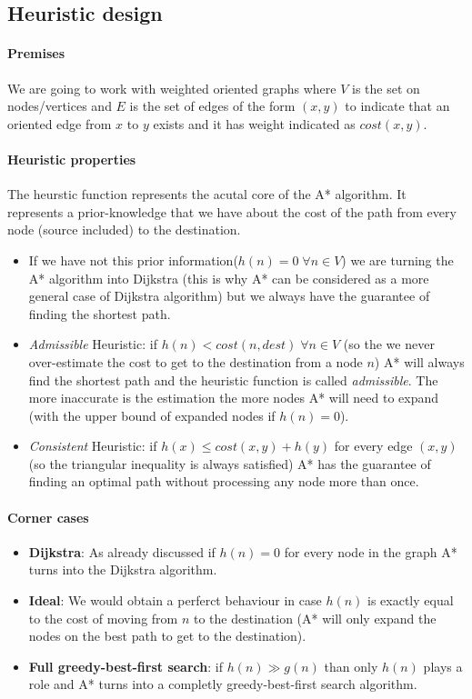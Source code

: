 \documentclass[twocolumn, switch]{article} %
\begin{document}
\subsection{Heuristic design}
\paragraph{Premises} We are going to work with weighted oriented graphs where $V$ is the set on nodes/vertices
and $E$ is the set of edges of the form $(x,y)$ to indicate that an oriented edge from $x$ to $y$ exists and it
has weight indicated as $cost(x, y)$.
\paragraph{Heuristic properties} 
The heurstic function represents the acutal core of the A* algorithm. It represents a prior-knowledge that
we have about the cost of the path from every node (source included) to the destination. 
\begin{itemize}
  \item If we have not this prior information($h(n) = 0 \;\forall n \in V$) we are turning the A* algorithm into
        Dijkstra (this is why A* can be considered as a more general case of Dijkstra algorithm) but we always
        have the guarantee of finding the shortest path. 
  \item \textit{Admissible} Heuristic: if $h(n) < cost(n, dest) \;\forall n \in V$ (so the we never over-estimate the cost to
        get to the destination from a node $n$) A* will always find the shortest path and the heuristic
        function is called \textit{admissible}. The more inaccurate
        is the estimation the more nodes A* will need to expand (with the upper bound of expanded nodes
        if $h(n) = 0$).
  \item \textit{Consistent} Heuristic: if $h(x) \le cost(x, y) + h(y)$ for every edge $(x, y)$ (so the triangular
        inequality is always satisfied) A* has the guarantee of finding an optimal path without processing
        any node more than once. 
\end{itemize}
\paragraph{Corner cases} 
\begin{itemize}
  \item \textbf{Dijkstra}: As already discussed if $h(n)=0$ for every node in the graph A* turns into the Dijkstra algorithm.
  \item \textbf{Ideal}: We would obtain a perferct behaviour in case $h(n)$ is exactly equal to the cost of moving from $n$ to
  the destination (A* will only expand the nodes on the best path to get to the destination).
  \item \textbf{Full greedy-best-first search}: if $h(n) \gg g(n)$ than only $h(n)$ plays a role and A* turns into
        a completly greedy-best-first search algorithm.
\end{itemize}
\end{document}

